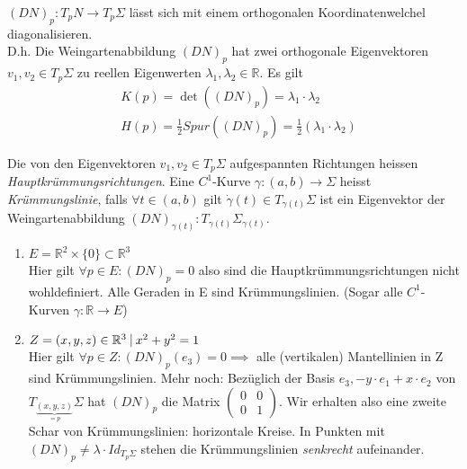 \documentclass[../main.tex]{subfiles}
\begin{document}
\begin{corollary}
    $(DN)_{p}:T_{p}N \rightarrow T_{p}\Sigma$ lässt sich mit einem orthogonalen Koordinatenwelchel diagonalisieren. \\D.h. Die Weingartenabbildung $(DN)_{p}$ hat zwei orthogonale Eigenvektoren $v_{1},v_{2} \in T_{p}\Sigma$ zu reellen Eigenwerten $\lambda_{1}, \lambda_{2} \in \mathbb{R} $.
    Es gilt \begin{align*}
        &K(p) = \det((DN)_{p}) = \lambda_{1} \cdot \lambda_{2}\\
        &H(p) = \frac{1}{2}Spur((DN)_{p}) = \frac{1}{2}(\lambda_{1} \cdot \lambda_{2})
    \end{align*}
\end{corollary}
\begin{definition}
    Die von den Eigenvektoren $v_{1}, v_{2} \in T_{p}\Sigma $ aufgespannten Richtungen heissen \emph{Hauptkrümmungsrichtungen}. 
    Eine $C^{1}$-Kurve $\gamma:(a,b) \rightarrow \Sigma $ heisst \emph{Krümmungslinie}, falls 
    $\forall t \in (a,b)$ gilt $\dot{\gamma}(t)\in T_{\gamma(t)}\Sigma $ ist ein Eigenvektor der Weingartenabbildung $(DN)_{\gamma(t)}:T_{\gamma(t)}\Sigma_{\gamma(t)} $.
\end{definition}
\begin{examples}
    \begin{enumerate} \leavevmode
        \item $E = \mathbb{R}^{2} \times \{0\} \subset \mathbb{R}^{3}$\\
        Hier gilt $\forall p \in E: (DN)_{p} = 0$ also sind die Hauptkrümmungsrichtungen nicht wohldefiniert. Alle Geraden in E sind Krümmungslinien. (Sogar alle $C^{1}$-Kurven $\gamma:\mathbb{R}\rightarrow E$)
        \item $Z = {(x,y,z)\in \mathbb{R}^{3} \ \vline \  x^{2} + y^{2} = 1}$\\
        Hier gilt $\forall p \in Z: (DN)_{p}(e_{3}) = 0 \implies $ alle (vertikalen) Mantellinien in Z sind Krümmungslinien.
        Mehr noch: Bezüglich der Basis ${e_{3}, -y\cdot e_{1} + x\cdot e_{2}}$ von $T_{\underbrace{(x,y,z)}_{=p}}\Sigma$ hat $(DN)_{p}$ die Matrix $\begin{pmatrix} 0 & 0 \\ 0 & 1 \end{pmatrix}$.
        Wir erhalten also eine zweite Schar von Krümmungslinien: horizontale Kreise.
        In Punkten mit $(DN)_{p} \neq \lambda \cdot Id_{T_{p}\Sigma}$ stehen die Krümmungslinien \emph{senkrecht} aufeinander.
    \end{enumerate}
\end{examples}
\end{document}
